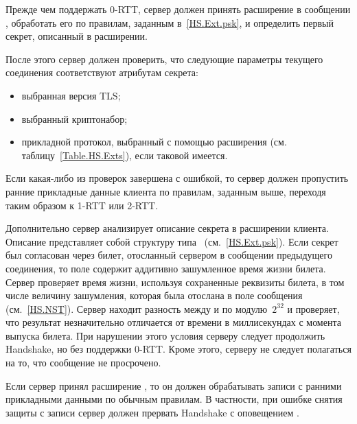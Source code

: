 Прежде чем поддержать 0-RTT, сервер должен принять расширение 
 в сообщении ,
обработать его по правилам, заданным в~\ref{HS.Ext.psk}, и определить первый 
секрет, описанный в расширении.


После этого сервер должен проверить, что следующие параметры текущего соединения 
соответствуют атрибутам секрета:
\begin{itemize} 
\item
выбранная версия TLS;
%
%
\item
выбранный криптонабор;
\item
прикладной протокол, выбранный с помощью расширения 
 (см. 
таблицу~\ref{Table.HS.Exts}), если таковой имеется.
\end{itemize}
%
Если какая-либо из проверок завершена с ошибкой, то сервер должен пропустить 
ранние прикладные данные клиента по правилам, заданным выше, переходя таким 
образом к 1-RTT или 2-RTT.


Дополнительно сервер анализирует описание секрета в расширении
 клиента. Описание представляет собой
структуру типа~ (см.~\ref{HS.Ext.psk}). Если секрет был
согласован через билет, отосланный сервером в сообщении
 предыдущего соединения, то поле
 содержит аддитивно зашумленное время 
жизни билета.
%
Сервер проверяет время жизни, используя сохраненные реквизиты билета,
в том числе величину зашумления, которая была отослана в поле 
 сообщения~ 
(см.~\ref{HS.NST}).
%
Сервер находит разность между  и 
 по модулю~$2^{32}$ и проверяет, что 
результат незначительно отличается от времени в миллисекундах с момента выпуска 
билета. При нарушении этого условия серверу следует продолжить Handshake, но 
без поддержки 0-RTT. Кроме этого, серверу не следует полагаться на то, что 
сообщение  не просрочено.

Если сервер принял расширение , то он должен обрабатывать 
записи с ранними прикладными данными по обычным правилам. В частности, при 
ошибке снятия защиты с записи сервер должен прервать Handshake с оповещением 
.

